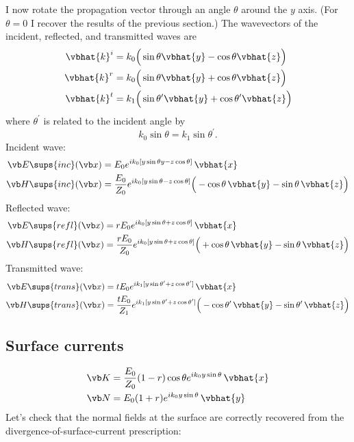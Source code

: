 \documentclass{article}
\begin{document}
I now rotate the propagation vector through an angle $\theta$ around
the $y$ axis. (For $\theta=0$ I recover the results of the previous
section.)
The wavevectors of the incident, reflected, and transmitted waves
are 
\begin{align*}
 \vbhat{k}^i &= k_0\Big( \sin\theta \vbhat{y} - \cos\theta\vbhat{z} \Big) \\
 \vbhat{k}^r &= k_0\Big( \sin\theta \vbhat{y} + \cos\theta\vbhat{z} \Big) \\
 \vbhat{k}^t &= k_1\Big( \sin\theta^\prime \vbhat{y} + \cos\theta^\prime\vbhat{z} \Big)\\
\end{align*}
where $\theta^\prime$ is related to the incident angle by 
$$ k_0\sin\theta = k_1 \sin \theta^\prime. $$
%
Incident wave:
%
\begin{align*}
\vb E\sups{inc}(\vb x) 
 &= E_0 e^{ik_0[y\sin\theta y - z\cos\theta ]} \, \vbhat{x} 
\\
\vb H\sups{inc}(\vb x) 
 &= \frac{E_0}{Z_0} 
    e^{ik_0[y\sin\theta  - z\cos\theta]} 
    \Big( -\cos\theta\,\vbhat{y} - \sin\theta\,\vbhat{z}\Big)
\end{align*}
%
Reflected wave:
%
\begin{align*}
\vb E\sups{refl}(\vb x)
 &= rE_0 e^{ik_0[y\sin\theta  + z\cos\theta]} \, \vbhat{x} 
\\
\vb H\sups{refl}(\vb x)
 &= \frac{rE_0}{Z_0} 
    e^{ik_0[y\sin\theta  + z\cos\theta ]}
    \Big( +\cos\theta\,\vbhat{y} - \sin\theta\,\vbhat{z}\Big)
\end{align*}
%
Transmitted wave:
%
\begin{align*}
\vb E\sups{trans}(\vb x)
 &= tE_0 e^{ik_1[y\sin\theta^\prime  + z\cos\theta^\prime]} \, \vbhat{x} 
\\
\vb H\sups{trans}(\vb x)
 &= \frac{tE_0}{Z_1} 
    e^{ik_1[y\sin\theta^\prime  + z\cos\theta^\prime]}
    \Big( -\cos\theta^\prime\,\vbhat{y} - \sin\theta^\prime\,\vbhat{z}\Big)
\end{align*}

\subsection*{Surface currents}

\begin{align*}
  \vb K &= \frac{E_0}{Z_0} (1-r)\cos\theta e^{ik_0 y \sin \theta} 
            \, \vbhat{x} 
\\
  \vb N &= E_0 (1+r) e^{ik_0 y \sin \theta} \, \vbhat{y} 
\end{align*}
%
Let's check that the normal fields at the surface are 
correctly recovered from the divergence-of-surface-current 
prescription:
\end{document}

